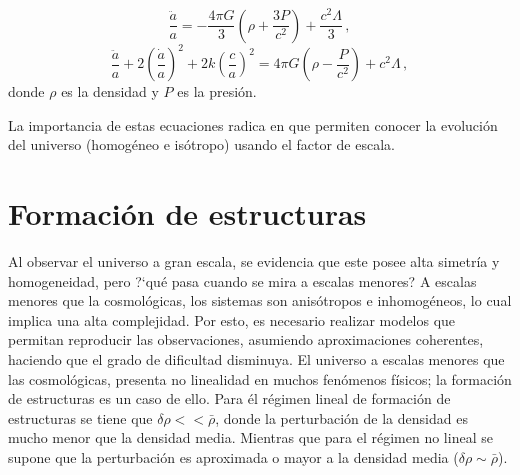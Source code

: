 \begin{equation}
\frac{\ddot{a}}{a} = -\frac{4\pi G}{3}\left(\rho + \frac{3P}{c^{2}} \right) + \frac{c^{2}\Lambda}{3}\,,
\end{equation}
\begin{equation}
\frac{\ddot{a}}{a}+2 \left(\frac{\dot{a}}{a}\right)^{2} + 2k\left(\frac{c}{a} \right)^{2} =4\pi G\left( \rho - \frac{P}{c^{2}}\right)+ c^{2}\Lambda\,,
\end{equation}
%
donde $\rho$ es la densidad y $P$ es la presión.

La importancia de estas ecuaciones radica en que permiten conocer la evolución del universo (homogéneo e isótropo) usando el factor de escala. 


\section{Formación de estructuras}
\label{sec: Estructure_Formation}




Al observar el universo a gran escala, se evidencia que este posee alta simetría y homogeneidad, pero ?`qué pasa cuando se mira a escalas menores? A escalas menores que la cosmológicas, los sistemas son anisótropos e inhomogéneos, lo cual implica una alta complejidad. Por esto, es necesario realizar modelos que permitan reproducir las observaciones, asumiendo aproximaciones coherentes,  haciendo que el grado de dificultad disminuya. El universo a escalas menores que las cosmológicas, presenta no linealidad en muchos fenómenos físicos; la formación de estructuras es un caso de ello. 
Para él régimen lineal de formación de estructuras se tiene que $\delta\rho << \bar{\rho}$, donde la perturbación de la densidad es mucho menor que la densidad media. Mientras que para el régimen no lineal se supone que la perturbación es aproximada o mayor a la densidad media ($\delta\rho \sim \bar{\rho}$).


